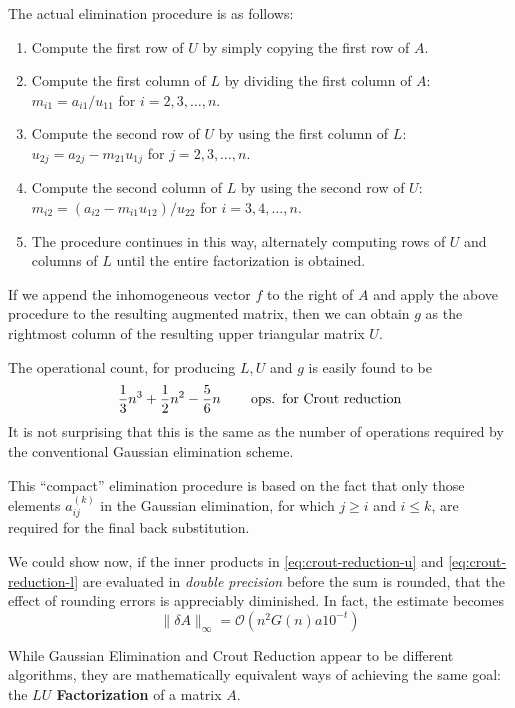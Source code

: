 \documentclass[../main.tex]{subfiles}
\begin{document}
The actual elimination procedure is as follows:
\begin{enumerate}
	\item Compute the first row of $U$ by simply copying the first row of $A$.
	\item Compute the first column of $L$ by dividing the first column of $A$: $m_{i1} = a_{i1} / u_{11}$ for $i = 2, 3, \ldots, n$.
	\item Compute the second row of $U$ by using the first column of $L$: $u_{2j} = a_{2j} - m_{21} u_{1j}$ for $j = 2, 3, \ldots, n$.
	\item Compute the second column of $L$ by using the second row of $U$: $m_{i2} = (a_{i2} - m_{i1} u_{12}) / u_{22}$ for $i = 3, 4, \ldots, n$.
	\item The procedure continues in this way, alternately computing rows of $U$ and columns of $L$ until the entire factorization is obtained.
\end{enumerate}

If we append the inhomogeneous vector $f$ to the right of $A$ and apply the above procedure to the resulting augmented matrix, then we can obtain $g$ as the rightmost column of the resulting upper triangular matrix $U$.

The operational count, for producing $L, U$ and $g$ is easily found to be
\begin{equation*}
	\frac{1}{3} n^3 + \frac{1}{2} n^2 - \frac{5}{6} n \qquad \operatorname{ops.} \text{ for Crout reduction}
\end{equation*}
It is not surprising that this is the same as the number of operations required by the conventional Gaussian elimination scheme.

\begin{remark}
	This ``compact'' elimination procedure is based on the fact that only those elements $a_{ij}^{(k)}$ in the Gaussian elimination, for which $j \geq i$ and $i \leq k$, are required for the final back substitution.
\end{remark}

We could show now, if the inner products in \ref{eq:crout-reduction-u} and \ref{eq:crout-reduction-l} are evaluated in \emph{double precision} before the sum is rounded, that the effect of rounding errors is appreciably diminished. In fact, the estimate becomes
\begin{equation}
	\| \delta A \|_{\infty} = \mathcal{O}(n^2 G(n) a 10^{-t})
\end{equation}

While Gaussian Elimination and Crout Reduction appear to be different algorithms, they are mathematically equivalent ways of achieving the same goal: the \textbf{$LU$ Factorization} of a matrix $A$.
\end{document}
